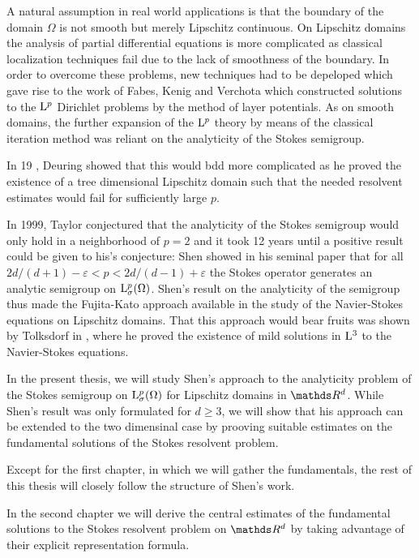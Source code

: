 A natural assumption in real world applications is that the boundary of the domain $\Omega$ is not smooth but merely Lipschitz continuous. 
On Lipschitz domains the analysis of partial differential equations is more complicated as classical localization techniques fail due to the lack of smoothness of the boundary.
In order to overcome these problems, new techniques had to be depeloped which gave rise to the work of Fabes, Kenig and Verchota \cite{fabesKenigVerchota} which constructed solutions to the $\mathrm{L}^p$ Dirichlet problems by the method of layer potentials.
As on smooth domains, the further expansion of the $\mathrm{L}^p$ theory by means of the classical iteration method was reliant on the analyticity of the Stokes semigroup.

In 19 , Deuring showed that this would bdd more complicated as he proved the existence of a tree dimensional Lipschitz domain such that the needed resolvent estimates would fail for sufficiently large $p$.

In 1999, Taylor conjectured that the analyticity of the Stokes semigroup would only hold in a neighborhood of $p = 2$ and it took 12 years until a positive result could be given to his's conjecture:  Shen showed in his seminal paper \cite{Shen2012} that for all $2d/( d + 1) - \varepsilon < p < 2d/(d - 1) + \varepsilon$ the Stokes operator generates an analytic semigroup on $\mathrm{L}^p_\sigma(\Omega)$.
Shen's result on the analyticity of the semigroup thus made the Fujita-Kato approach available in the study of the Navier-Stokes equations on Lipschitz domains. 
That this approach would bear fruits was shown by Tolksdorf in \cite{paper}, where he proved the existence of mild solutions in $\mathrm{L}^3$ to the Navier-Stokes equations.

In the present thesis, we will study Shen's approach to the analyticity problem of the Stokes semigroup on $\mathrm{L}^p_\sigma(\Omega)$ for Lipschitz domains in $\R^d$.
While Shen's result was only formulated for $d \geq 3$, we will show that his approach can be extended to the two dimensinal case by prooving suitable estimates on the fundamental solutions of the Stokes resolvent problem.

Except for the first chapter, in which we will gather the fundamentals, the rest of this thesis will closely follow the structure of Shen's work. 

In the second chapter we will derive the central estimates of the fundamental solutions to the Stokes resolvent problem on $\R^d$ by taking advantage of their explicit representation formula.

